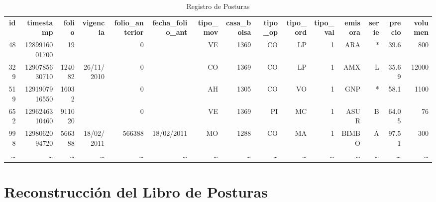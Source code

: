 \documentclass[11pt]{article}
\numberwithin{equation}{section} %
\begin{document}
\begin{landscape}
\begin{table}[htbp]\scriptsize
\centering
\caption{ Registro de Posturas}
\setlength\tabcolsep{1.25pt}
\begin{tabular}{rrrrrrrrrrrrrrr}
\textbf{ id}    & \textbf{timestamp} & \textbf{folio} & \textbf{vigencia} & \textbf{folio\_anterior} & \textbf{fecha\_folio\_ant} & \textbf{tipo\_mov} & \textbf{casa\_bolsa} & \textbf{tipo\_op} & \textbf{tipo\_ord} & \textbf{tipo\_val} & \textbf{emisora} & \textbf{serie} & \textbf{precio} & \textbf{volumen} \\
48 & 1289916001700 & 19    &       & 0     &       & VE    & 1369  & CO    & LP    & 1     & ARA & *     & 39.6  & 800 \\
329 & 1290785630710 & 124082 & 26/11/2010 & 0     &       & CO    & 1369  & CO    & LP    & 1     & AMX   & L     & 35.69 & 12000 \\
519 & 1291907916550 & 16032 &       & 0     &       & AH    & 1305  & CO    & VO    & 1     & GNP & *     & 58.1  & 1100 \\
652 & 1296246310460 & 911020 &       & 0     &       & VE    & 1369  & PI    & MC    & 1     & ASUR  & B     & 64.05 & 76 \\
998 & 1298062094720 & 566388 & 18/02/2011 & 566388 & 18/02/2011 & MO    & 1288  & CO    & MA    & 1     & BIMBO & A     & 97.51 & 300 \\
\ldots & \ldots & \ldots & \ldots & \ldots & \ldots & \ldots & \ldots & \ldots & \ldots & \ldots & \ldots & \ldots & \ldots & \ldots \\
\end{tabular}%
\label{tab:regposturasl}%
\end{table}%

\end{landscape}

\clearpage

\section{Reconstrucción del Libro de Posturas}
\end{document}
